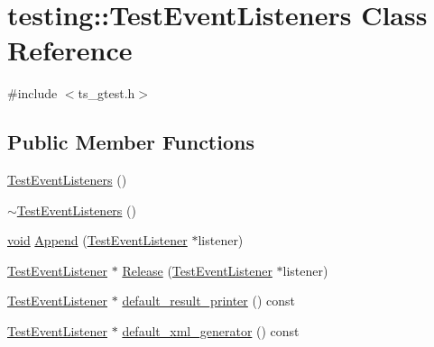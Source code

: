 \hypertarget{classtesting_1_1TestEventListeners}{\section{testing\-:\-:Test\-Event\-Listeners Class Reference}
\label{classtesting_1_1TestEventListeners}
}


{\ttfamily \#include $<$ts\-\_\-gtest.\-h$>$}

\subsection*{Public Member Functions}
\begin{DoxyCompactItemize}
\item 
\hyperlink{classtesting_1_1TestEventListeners_af0716e4067a6f357ee5ea18802a591dd}{Test\-Event\-Listeners} ()
\item 
\hyperlink{classtesting_1_1TestEventListeners_abe9fbbbedf7f55fa898abfae60aa4913}{$\sim$\-Test\-Event\-Listeners} ()
\item 
\hyperlink{legacy_8hpp_a8bb47f092d473522721002c86c13b94e}{void} \hyperlink{classtesting_1_1TestEventListeners_a1207dce74d64c1c39ffa6105560536a0}{Append} (\hyperlink{classtesting_1_1TestEventListener}{Test\-Event\-Listener} $\ast$listener)
\item 
\hyperlink{classtesting_1_1TestEventListener}{Test\-Event\-Listener} $\ast$ \hyperlink{classtesting_1_1TestEventListeners_a5d4bfb7d8584801d6074bb0ec28f8bda}{Release} (\hyperlink{classtesting_1_1TestEventListener}{Test\-Event\-Listener} $\ast$listener)
\item 
\hyperlink{classtesting_1_1TestEventListener}{Test\-Event\-Listener} $\ast$ \hyperlink{classtesting_1_1TestEventListeners_a0a69b6a19e27d53d9ef4683c05e9f75a}{default\-\_\-result\-\_\-printer} () const 
\item 
\hyperlink{classtesting_1_1TestEventListener}{Test\-Event\-Listener} $\ast$ \hyperlink{classtesting_1_1TestEventListeners_a9867c9af50e8d2934a2475286c7cebc5}{default\-\_\-xml\-\_\-generator} () const 
\end{DoxyCompactItemize}
